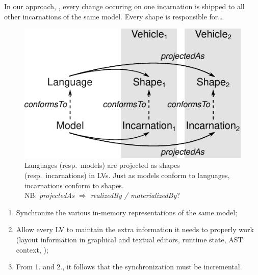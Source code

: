 In our approach, \prism, every change occuring on one incarnation is shipped to all other incarnations of the same model.
Every shape is responsible for\dots

\begin{figure}[bt]
	\centering
	\includegraphics[width=.8\columnwidth]{figures/concepts}
	\caption{Languages (resp.~models) are projected as shapes (resp.~incarnations) in LVs. Just as models conform to languages, incarnations conform to shapes.\\NB: \emph{projectedAs $\Rightarrow$ realizedBy / materializedBy}?}
	\label{fig:concepts}
\end{figure}

\begin{enumerate}
	\item Synchronize the various in-memory representations of the same model;
	\item Allow every LV to maintain the extra information it needs to properly work (layout information in graphical and textual editors, runtime state, AST context, \etc);
	\item From 1. and 2., it follows that the synchronization must be incremental.
\end{enumerate}

